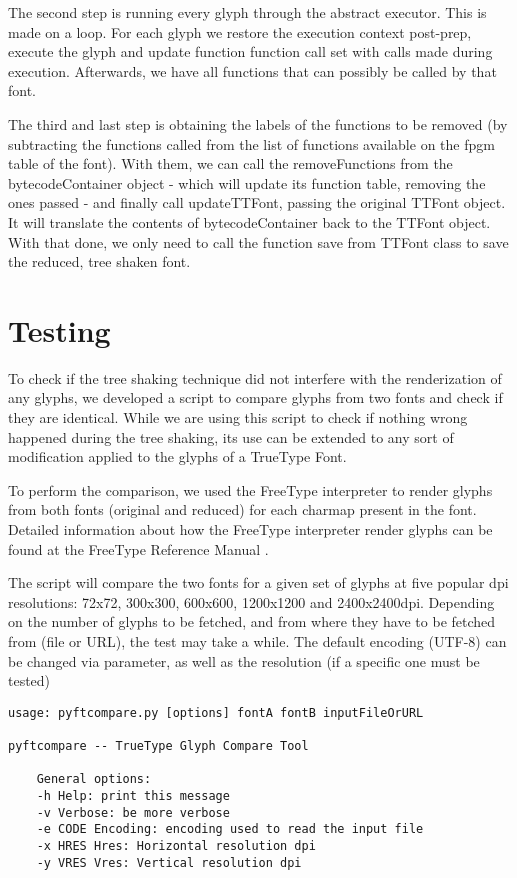 \documentclass[12pt]{article}
\begin{document}
The second step is running every glyph through the abstract executor.
This is made on a loop. For each glyph we restore the execution
context post-prep, execute the glyph and update function function call
set with calls made during execution. Afterwards, we have all functions
that can possibly be called by that font.

The third and last step is obtaining the labels of the functions
to be removed (by subtracting the functions called from the list of
functions available on the fpgm table of the font). With them, we can
call the removeFunctions from the bytecodeContainer object - which will
update its function table, removing the ones passed - and finally call
updateTTFont, passing the original TTFont object. It will translate the
contents of bytecodeContainer back to the TTFont object. With that done,
we only need to call the function save from TTFont class to save the
reduced, tree shaken font.

\section{Testing}

To check if the tree shaking technique did not interfere with the
renderization of any glyphs, we developed a script to compare glyphs
from two fonts and check if they are identical. While we are using this
script to check if nothing wrong happened during the tree shaking, its
use can be extended to any sort of modification applied to the glyphs of
a TrueType Font.

To perform the comparison, we used the FreeType interpreter to render
glyphs from both fonts (original and reduced) for each charmap present
in the font. Detailed information about how the FreeType interpreter render
glyphs can be found at the FreeType Reference
Manual \cite{freetypemanual}. 

The script will compare the two fonts for a given set of glyphs at
five popular dpi resolutions: 72x72, 300x300, 600x600, 1200x1200 and
2400x2400dpi. Depending on the number of glyphs to be fetched, and from
where they have to be fetched from (file or URL), the test may take a
while. The default encoding (UTF-8) can be changed via parameter, as
well as the resolution (if a specific one must be tested)

\begin{lstlisting}
usage: pyftcompare.py [options] fontA fontB inputFileOrURL

pyftcompare -- TrueType Glyph Compare Tool

    General options:
    -h Help: print this message
    -v Verbose: be more verbose
    -e CODE Encoding: encoding used to read the input file
    -x HRES Hres: Horizontal resolution dpi
    -y VRES Vres: Vertical resolution dpi
\end{lstlisting}
\end{document}

